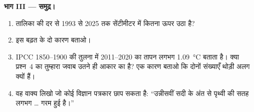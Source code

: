 \begin{problem}
\noindent\textbf{भाग III --- समुद्र।}\par\nopagebreak
\begin{enumerate}[resume, beginpenalty=10000]
  \item तालिका की दर से 1993 से 2025 तक  सेंटीमीटर में कितना ऊपर उठा है?
  \item इस बढ़त के दो कारण बताओ।
  \item IPCC 1850--1900 की तुलना में 2011--2020 का तापन लगभग
        \qty{1.09}{\degreeCelsius} बताता है। क्या प्रश्न~4 का तुम्हारा जवाब उतने ही
        आकार का है? एक कारण बताओ कि दोनों संख्याएँ थोड़ी अलग क्यों
        हैं।
  \item वह वाक्य लिखो जो कोई विज्ञान पत्रकार छाप सकता है: ``उन्नीसवीं सदी के अंत से
        पृथ्वी की सतह लगभग \ldots{} गरम हुई है।''
\end{enumerate}
\end{problem}
